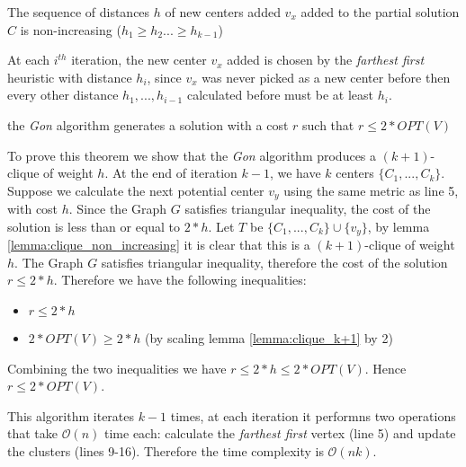 \begin{lemma}\label{lemma:clique_non_increasing}
The sequence of distances $h$ of new centers added $v_x$ added to the partial solution $C$ is non-increasing ($h_1\geq h_2 ...\geq h_{k-1}$)
\end{lemma}

At each $i^{th}$ iteration, the new center $v_x$ added is chosen by the \emph{farthest first} heuristic with distance $h_i$, since $v_x$ was never picked as a new center before then every other distance $h_1,...,h_{i-1}$ calculated before must be at least $h_i$.

\begin{theorem} 
the \emph{Gon} algorithm generates a solution with a cost $r$ such that $r\leq 2 * OPT(V)$
\end{theorem}

To prove this theorem we show that the \emph{Gon} algorithm produces a $(k+1)$-clique of weight $h$. At the end of iteration $k-1$, we have $k$ centers $\{C_1, ...,C_k\}$. Suppose we calculate the next potential center $v_y$ using the same metric as line 5, with cost $h$. Since the Graph $G$ satisfies triangular inequality, the cost of the solution is less than or equal to $2*h$. Let $T$ be $\{C_1, ...,C_k\}\cup\{v_y\}$, by lemma \ref{lemma:clique_non_increasing} it is clear that this is a $(k+1)$-clique of weight $h$. The Graph $G$ satisfies triangular inequality, therefore the cost of the solution $r\leq 2*h$. Therefore we have the following inequalities:
\begin{itemize}
    \item $r\leq 2*h$
    \item $2 * OPT(V)\geq 2*h$ (by scaling lemma \ref{lemma:clique_k+1} by 2) 
\end{itemize}
Combining the two inequalities we have $r\leq 2*h\leq 2 * OPT(V)$. Hence $r\leq 2 * OPT(V)$.

This algorithm iterates $k-1$ times, at each iteration it performns two operations that take $\mathcal{O}(n)$ time each: calculate the \emph{farthest first} vertex (line 5) and update the clusters (lines 9-16). Therefore the time complexity is $\mathcal{O}(nk)$.
